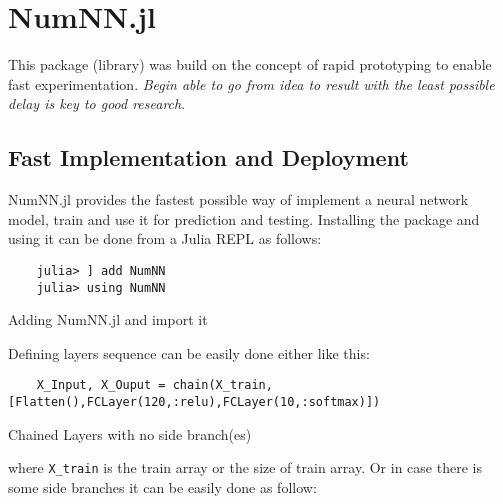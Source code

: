 \section{NumNN.jl}

This package (library) was build on the concept of rapid prototyping to enable fast experimentation. \emph{Begin able to go from idea to result with the least possible delay is key to good research}\cite{Keras}.

\subsection{Fast Implementation and Deployment}

NumNN.jl provides the fastest possible way of implement a neural network model, train and use it for prediction and testing. Installing the package and using it can be done from a Julia REPL as follows:

\begin{listing}[H]
	\begin{verbatim}
	julia> ] add NumNN
	julia> using NumNN
	\end{verbatim}
	\caption{Adding NumNN.jl and import it}\label{addimport}
\end{listing}

Defining layers sequence can be easily done either like this:

\begin{listing}[H]
	\begin{verbatim}
	X_Input, X_Ouput = chain(X_train,[Flatten(),FCLayer(120,:relu),FCLayer(10,:softmax)])
	\end{verbatim}
	\caption{Chained Layers with no side branch(es)}\label{chain}
\end{listing}


where \texttt{X_train} is the train array or the size of train array. Or in case there is some side branches it can be easily done as follow:

